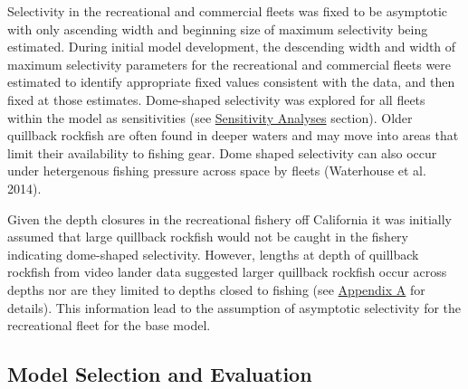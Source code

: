 \documentclass[11pt,
  english,
  a4paper,
]{article}
\begin{document}
\leavevmode\tagmcend\tagstructend\par


Selectivity in the recreational and commercial fleets was fixed to be asymptotic with only ascending width and beginning size of maximum selectivity being estimated. During initial model development, the descending width and width of maximum selectivity parameters for the recreational and commercial fleets were estimated to identify appropriate fixed values consistent with the data, and then fixed at those estimates. Dome-shaped selectivity was explored for all fleets within the model as sensitivities (see {\protect\hyperlink{sensitivity-analyses}{Sensitivity Analyses}\leavevmode\tagmcend\tagstructend} section). Older quillback rockfish are often found in deeper waters and may move into areas that limit their availability to fishing gear. Dome shaped selectivity can also occur under hetergenous fishing pressure across space by fleets {(Waterhouse et al. 2014)\leavevmode\tagmcend\tagstructend}.

\leavevmode\tagmcend\tagstructend\par


Given the depth closures in the recreational fishery off California it was initially assumed that large quillback rockfish would not be caught in the fishery indicating dome-shaped selectivity. However, lengths at depth of quillback rockfish from video lander data suggested larger quillback rockfish occur across depths nor are they limited to depths closed to fishing (see {\protect\hyperlink{append_a}{Appendix A}\leavevmode\tagmcend\tagstructend} for details). This information lead to the assumption of asymptotic selectivity for the recreational fleet for the base model.

\leavevmode\tagmcend\tagstructend\par


\hypertarget{model-selection-and-evaluation}{%
\subsection{Model Selection and Evaluation}\label{model-selection-and-evaluation}}
\end{document}

